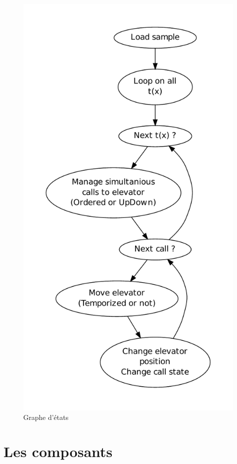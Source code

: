 \documentclass[twocolumn,oneside,10pt]{article}
\begin{document}
\begin{figure}[h]
  \centering
  \includegraphics[scale=0.50]{images/elevator}
  \caption{Graphe d'états}
  \label{fig:graphe_etat}
\end{figure}

\section{Les composants}
\end{document}
